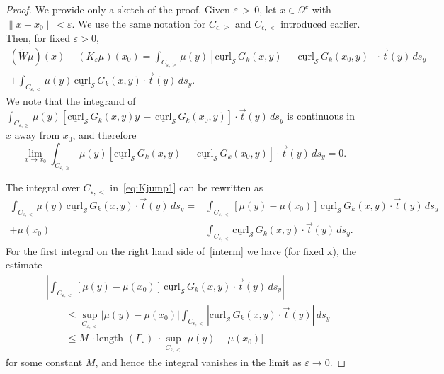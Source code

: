 \documentclass[final]{siamltex}
\renewcommand{\S} {\mathcal{S}}
\newcommand{\e}{\varepsilon}
\begin{document}
\begin{proof}
We provide only a sketch of the proof.  
Given $\varepsilon \, > \,0$, let $x\in \Omega^{c}$ with $ \|
x-x_0\|<\varepsilon$.   We use the same notation for $C_{\epsilon,\geq}$ and $C_{\epsilon,<}$ introduced earlier.
Then, for fixed $\e>0$, 
\begin{align}\label{eq:Kjump1}
(\widetilde{W}\mu)(x)-(K_{\varepsilon} \mu)(x_0) =  \int_{C_{\e,\geq}}
\mu(y)\left[\underline{\mbox{curl}}_{\S}\, G_k(x,y)\,-\,\underline{\mbox{curl}}_{\S}\,G_k(x_0,y)\right]\cdot\vec{t}(y)\, ds_{y} \nonumber\\
+\int_{C_{\e,<}}
\mu(y)\,\underline{\mbox{curl}}_{\S}\,G_k(x,y)\cdot\vec{t}(y)\,ds_y.
\end{align}
We note that the integrand of $ \int_{C_{\e,\geq}}
\mu(y)\left[\underline{\mbox{curl}}_{\S}\, G_k(x,y)y\,-\,\underline{\mbox{curl}}_{\S}\,G_k(x_0,y)\right]\cdot\vec{t}(y)\, ds_{y}$ is continuous in $x$ away from  $x_0$, and therefore 
$$ \lim_{x\rightarrow x_0}  \int_{C_{\e,\geq}}
\mu(y)\left[\underline{\mbox{curl}}_{\S}\, G_k(x,y)\,-\,\underline{\mbox{curl}}_{\S}\,G_k(x_0,y)\right]\cdot\vec{t}(y)\, ds_{y} =0.$$

The integral over $C_{\e,<}$ in~\eqref{eq:Kjump1} can be rewritten as
\begin{align}
  \int_{C_{\e,<}} \mu(y)\,\underline{\mbox{curl}}_{\S}\,
    G_k(x,y)\cdot\vec{t}(y)\,ds_{y} 
  = &\int_{C_{\e,<}} \left[\mu(y)-\mu(x_0)\right]\,
    \underline{\mbox{curl}}_{\S}\,G_k(x,y)\cdot\vec{t}(y)\,ds_{y}
    \nonumber \\
  + \mu(x_0)&\int_{C_{\e,<}} \underline{\mbox{curl}}_{\S}\,
    G_k(x,y)\cdot\vec{t}(y)\,ds_{y}.
  \label{interm}
\end{align}
For the first integral on the right hand side of~\eqref{interm} we have
(for fixed x), the estimate
\begin{align*}
  &\left|\int_{C_{\e,<}} \left[\mu(y)-\mu(x_0)\right]\,
    \underline{\mbox{curl}}_{\S}\,G_k(x,y)\cdot\vec{t}(y)\,ds_{y}\right| \\
  &\qquad \leq \sup_{C_{\e,<}} |\mu(y)-\mu(x_0)|
    \int_{C_{e,<}} \left|\underline{\mbox{curl}}_{\S}\,
    G_k(x,y)\cdot\vec{t}(y)\right|\,ds_{y}\\
  &\qquad \leq M\,\cdot \mbox{length $(\Gamma_{\varepsilon})$}\;
    \cdot \sup_{C_{\e,<}} |\mu(y)-\mu(x_0)|
\end{align*}
for some constant $M$, and hence the integral vanishes in the limit as
  $\varepsilon\longrightarrow 0$.


\end{proof}
\end{document}
